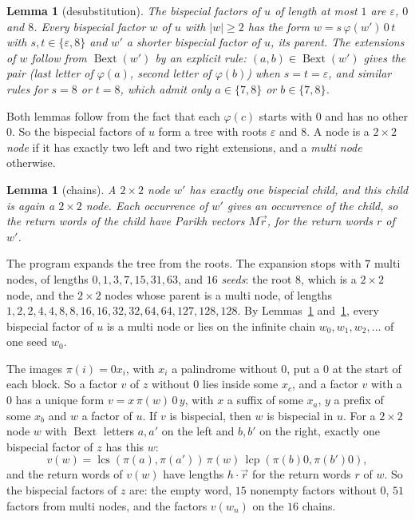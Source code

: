\documentclass[11pt]{article}
\newtheorem{lemma}[theorem]{Lemma}
\theoremstyle{remark}
\newcommand{\Bext}{\operatorname{Bext}}
\begin{document}
\begin{lemma}[desubstitution]\label{lem:desub}
The bispecial factors of $u$ of length at most $1$ are $\varepsilon$, $0$ and $8$. Every
bispecial factor $w$ of $u$ with $|w|\ge2$ has the form $w=s\,\varphi(w')\,0\,t$ with
$s,t\in\{\varepsilon,8\}$ and $w'$ a shorter bispecial factor of $u$, its
\emph{parent}. The extensions of $w$ follow from $\Bext(w')$ by an explicit rule:
$(a,b)\in\Bext(w')$ gives the pair (last letter of $\varphi(a)$, second letter of
$\varphi(b)$) when $s=t=\varepsilon$, and similar rules for $s=8$ or $t=8$, which
admit only $a\in\{7,8\}$ or $b\in\{7,8\}$.
\end{lemma}

Both lemmas follow from the fact that each $\varphi(c)$ starts with $0$ and has no other
$0$. So the bispecial factors of $u$ form a tree with roots $\varepsilon$ and $8$. A node
is a \emph{$2\times2$ node} if it has exactly two left and two right extensions, and a
\emph{multi node} otherwise.

\begin{lemma}[chains]\label{lem:chain}
A $2\times2$ node $w'$ has exactly one bispecial child, and this child is again a
$2\times2$ node. Each occurrence of $w'$ gives an occurrence of the child, so the return
words of the child have Parikh vectors $M\vec r$, for the return words $r$ of $w'$.
\end{lemma}

The program expands the tree from the roots. The expansion stops with $7$ multi nodes, of
lengths $0,1,3,7,15,31,63$, and $16$ \emph{seeds}: the root $8$, which is a $2\times2$ node, and the $2\times2$ nodes
whose parent is a multi node, of lengths $1,2,2,4,4,8,8,16,16,32,32,64,64,127,128,128$. By
Lemmas~\ref{lem:desub} and~\ref{lem:chain}, every bispecial factor of $u$ is a multi node
or lies on the infinite chain $w_0,w_1,w_2,\dots$ of one seed $w_0$.

The images $\pi(i)=0x_i$, with $x_i$ a palindrome without $0$, put a $0$ at the start of
each block. So a factor $v$ of $z$ without $0$ lies inside some $x_c$, and a factor $v$
with a $0$ has a unique form $v=x\,\pi(w)\,0\,y$, with $x$ a suffix of some $x_a$, $y$ a
prefix of some $x_b$ and $w$ a factor of $u$. If $v$ is bispecial, then $w$ is bispecial
in $u$. For a $2\times2$ node $w$ with $\Bext$ letters $a,a'$ on the left and $b,b'$ on
the right, exactly one bispecial factor of $z$ has this $w$:
\[
v(w)=\operatorname{lcs}(\pi(a),\pi(a'))\,\pi(w)\,\operatorname{lcp}(\pi(b)0,\pi(b')0),
\]
and the return words of $v(w)$ have lengths $h\cdot\vec r$ for the return words $r$ of
$w$. So the bispecial factors of $z$ are: the empty word, $15$ nonempty factors without
$0$, $51$ factors from multi nodes, and the factors $v(w_n)$ on the $16$ chains.
\end{document}
